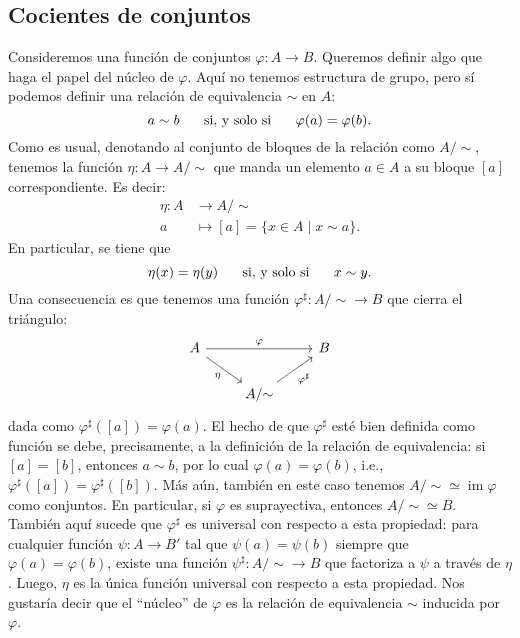 \documentclass[12pt,letterpaper,titlepage]{article}
\theoremstyle{definition}
\renewcommand\phi{\varphi}
\newcommand\simr{{\sim}}
\newcommand\ssi{\hspace{5mm}\text{ si, y solo si }\hspace{5mm}}
\newcommand\<{\langle}
\renewcommand\>{\rangle}
\DeclareMathOperator{\img}{im}
\begin{document}
\subsection{Cocientes de conjuntos}
Consideremos una función de conjuntos $\phi:A\to B$.
Queremos definir algo que haga el papel del núcleo de $\phi$.
Aquí no tenemos estructura de grupo, pero sí podemos definir una relación
de equivalencia $\sim$ en $A$:
\[
    a\sim b \ssi \phi(a) = \phi(b)
.\]
Como es usual, denotando al conjunto de bloques de la relación como
$A/\simr$, tenemos la función $\eta: A\to A/\simr$ que manda un elemento
$a\in A$ a su bloque $[a]$ correspondiente.
Es decir:
\begin{align*}
    \eta:A&\to A/\simr \\
    a&\mapsto [a] = \{x\in A \mid x\sim a\}.
\end{align*}
En particular, se tiene que
\[
    \eta(x) = \eta(y) \ssi x\sim y
.\]
Una consecuencia es que tenemos una función $\phi^\sharp:A/\simr \to B$ que
cierra el triángulo:
\[
\begin{tikzcd}
    A\ar[rr,"\phi"] \ar[dr,"\eta"'] && B \\
    & A/\simr \ar[ur,"\phi^\sharp"']
\end{tikzcd}
\]
dada como $\phi^\sharp([a]) = \phi(a)$.
El hecho de que $\phi^\sharp$ esté bien definida como función se debe,
precisamente, a la definición de la relación de equivalencia:
si $[a]=[b]$, entonces $a\sim b$, por lo cual $\phi(a)=\phi(b)$, i.e.,
$\phi^\sharp([a])=\phi^\sharp([b])$.
Más aún, también en este caso tenemos $A/\simr\simeq \img \phi$ como
conjuntos.
En particular, si $\phi$ es suprayectiva, entonces $A/\simr \simeq B$.
También aquí sucede que $\phi^\sharp$ es universal con respecto a esta
propiedad: para cualquier función $\psi:A\to B'$ tal que $\psi(a)=\psi(b)$
siempre que $\phi(a)=\phi(b)$, existe una función $\psi^\sharp:A/\simr\to B$
que factoriza a $\psi$ a través de $\eta$.
Luego, $\eta$ es la única función universal con respecto a esta propiedad.
Nos gustaría decir que el ``núcleo'' de $\phi$ es la relación de
equivalencia $\sim$ inducida por $\phi$.
\end{document}
